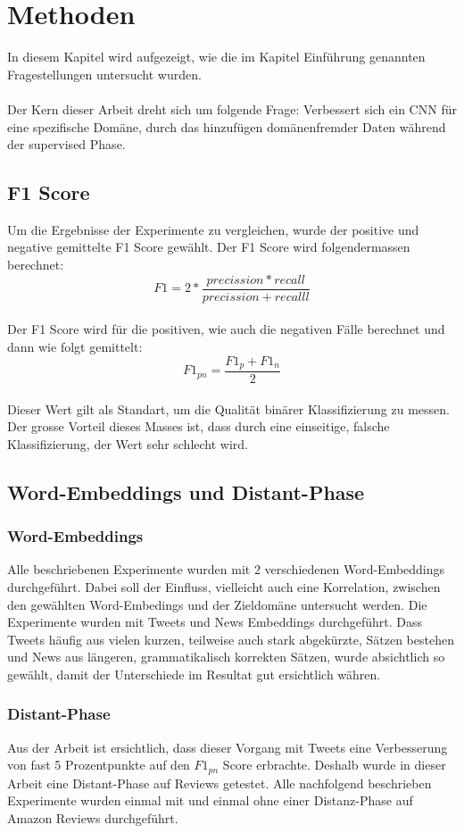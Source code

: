 \chapter{Methoden}
In diesem Kapitel wird aufgezeigt, wie die im Kapitel Einführung genannten Fragestellungen untersucht wurden.\\\\
Der Kern dieser Arbeit dreht sich um folgende Frage: Verbessert sich ein CNN für eine spezifische Domäne, durch das hinzufügen domänenfremder Daten während der supervised Phase.
\section{F1 Score}
Um die Ergebnisse der Experimente zu vergleichen, wurde der positive und negative gemittelte F1 Score gewählt.
Der F1 Score wird folgendermassen berechnet:\\
\begin{equation}
F1 = 2*\frac{precission*recall}{precission+recalll}
\end{equation}\\
Der F1 Score wird für die positiven, wie auch die negativen Fälle berechnet und dann wie folgt gemittelt:\\
\begin{equation}
F1_{pn} = \frac{F1_p+F1_n}{2}
\end{equation}\\
Dieser Wert gilt als Standart, um die Qualität binärer Klassifizierung zu messen. Der grosse Vorteil dieses Masses ist, dass durch eine einseitige, falsche Klassifizierung, der Wert sehr schlecht wird.
\section{Word-Embeddings und Distant-Phase}
\subsection{Word-Embeddings}
Alle beschriebenen Experimente wurden mit 2 verschiedenen Word-Embeddings durchgeführt. Dabei soll der Einfluss, vielleicht auch eine Korrelation, zwischen den gewählten Word-Embedings und der Zieldomäne untersucht werden. Die Experimente wurden mit Tweets und News Embeddings durchgeführt. Dass Tweets häufig aus vielen kurzen, teilweise auch stark abgekürzte, Sätzen bestehen und News aus längeren, grammatikalisch korrekten Sätzen, wurde absichtlich so gewählt, damit der Unterschiede im Resultat gut ersichtlich währen.
\subsection{Distant-Phase}
Aus der Arbeit \cite{deriu2016sentiment} ist ersichtlich, dass dieser Vorgang mit Tweets eine Verbesserung von fast 5 Prozentpunkte auf den $F1_{pn}$ Score erbrachte.
Deshalb wurde in dieser Arbeit eine Distant-Phase auf Reviews getestet. Alle nachfolgend beschrieben Experimente wurden einmal mit und einmal ohne einer Distanz-Phase auf Amazon Reviews durchgeführt.

